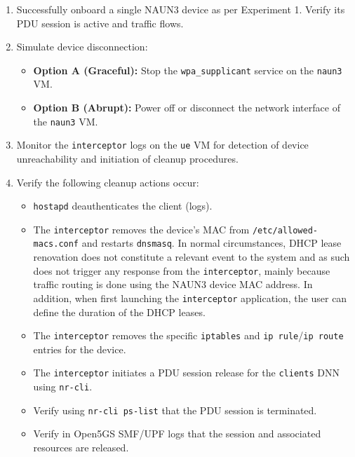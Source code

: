 \begin{enumerate}
    \item Successfully onboard a single \ac{NAUN3} device as per Experiment 1. Verify its \ac{PDU} session is active and traffic flows.

    \item{ Simulate device disconnection:
        \begin{itemize}
            \item \textbf{Option A (Graceful):} Stop the \texttt{wpa\_supplicant} service on the \texttt{naun3} \ac{VM}.
            \item \textbf{Option B (Abrupt):} Power off or disconnect the network interface of the \texttt{naun3} \ac{VM}.
        \end{itemize}
    }

    \item Monitor the \texttt{interceptor} logs on the \texttt{ue} \ac{VM} for detection of device unreachability and initiation of cleanup procedures.

    \item{
        Verify the following cleanup actions occur:
        \begin{itemize}
            \item \texttt{hostapd} deauthenticates the client (logs).

            \item The \texttt{interceptor} removes the device's \ac{MAC} from \texttt{/etc/allowed-macs.conf} and restarts \texttt{dnsmasq}. In normal circumstances, \ac{DHCP} lease renovation does not constitute a relevant event to the system and as such does not trigger any response from the \texttt{interceptor}, mainly because traffic routing is done using the \ac{NAUN3} device \ac{MAC} address. In addition, when first launching the \texttt{interceptor} application, the user can define the duration of the \ac{DHCP} leases.

            \item The \texttt{interceptor} removes the specific \texttt{iptables} and \texttt{ip rule}/\texttt{ip route} entries for the device.

            \item The \texttt{interceptor} initiates a \ac{PDU} session release for the \texttt{clients} \ac{DNN} using \texttt{nr-cli}.

            \item Verify using \texttt{nr-cli ps-list} that the \ac{PDU} session is terminated.
            
            \item Verify in Open5GS \ac{SMF}/\ac{UPF} logs that the session and associated resources are released.
        \end{itemize}
    }    
\end{enumerate}


